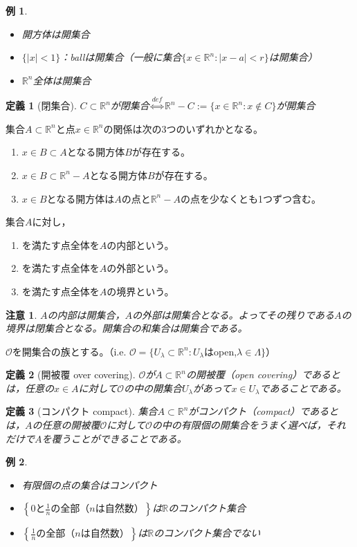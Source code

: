 \documentclass[dvipdfmx,a4j,10pt]{jsarticle}
\theoremstyle{mystyle1}
\theoremstyle{mystyle2}
\newtheorem{dfn*}{定義}
\newtheorem{example}{例}
\newtheorem{note}{注意}
\begin{document}
\begin{example}　
\begin{itemize}
	\item 開方体は開集合
	\item $\{|x|<1\}$：ballは開集合（一般に集合$\{x\in\mathbb{R}^n:|x-a|<r\}$は開集合）
	\item $\mathbb{R}^n$全体は開集合
\end{itemize}

\end{example}
\begin{framed}
\begin{dfn*}[閉集合]
$C\subset\mathbb{R}^n$が閉集合$\overset{def}{\Leftrightarrow}$$\mathbb{R}^n-C:=\{x\in\mathbb{R}^n:x\notin C\}$が開集合
\end{dfn*}
\end{framed}
集合$A\subset\mathbb{R}^n$と点$x\in\mathbb{R}^n$の関係は次の3つのいずれかとなる。
\begin{enumerate}
	\item $x\in B\subset A$となる開方体$B$が存在する。
	\item $x\in B\subset \mathbb{R}^n-A$となる開方体$B$が存在する。
	\item $x\in B$となる開方体は$A$の点と$\mathbb{R}^n-A$の点を少なくとも1つずつ含む。
\end{enumerate}
集合$A$に対し，
\begin{enumerate}
\item を満たす点全体を$A$の内部という。
\item を満たす点全体を$A$の外部という。
\item を満たす点全体を$A$の境界という。
\end{enumerate}
\begin{note}
$A$の内部は開集合，$A$の外部は開集合となる。よってその残りである$A$の境界は閉集合となる。開集合の和集合は開集合である。
\end{note}
$\mathscr{O}$を開集合の族とする。（i.e. $\mathscr{O}=\{U_{\lambda}\subset\mathbb{R}^n:U_\lambda$はopen,$\lambda\in\Lambda\}$）
\begin{dfn*}[開被覆 over covering]
    $\mathscr{O}$が$A\subset\mathbb{R}^n$の開被覆（open covering）であるとは，任意の$x\in A$に対して$\mathscr{O}$の中の開集合$U_\lambda$があって$x\in U_\lambda$であることである。
\end{dfn*}
\begin{dfn*}[コンパクト compact]
集合$A\subset\mathbb{R}^n$がコンパクト（compact）であるとは，$A$の任意の開被覆$\mathscr{O}$に対して$\mathscr{O}$の中の有限個の開集合をうまく選べば，それだけで$A$を覆うことができることである。
\end{dfn*}
\begin{example}\
	\begin{itemize}
		\item 有限個の点の集合はコンパクト
		\item $\displaystyle\left\{0と\frac{1}{n}の全部（nは自然数）\right\}$は$\mathbb{R}$のコンパクト集合
		\item $\displaystyle\left\{\frac{1}{n}の全部（nは自然数）\right\}$は$\mathbb{R}$のコンパクト集合でない
	\end{itemize}
\end{example}
\end{document}
